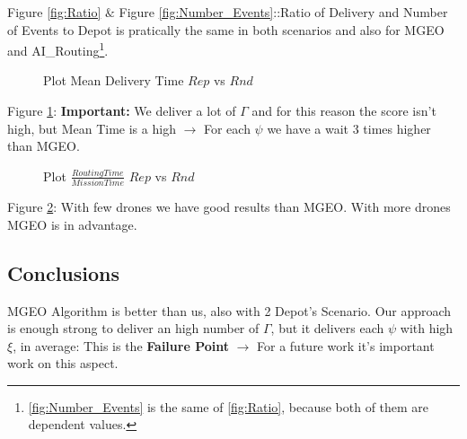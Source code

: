 \documentclass[12pt]{article}
\begin{document}
Figure \ref{fig:Ratio} $\&$ Figure \ref{fig:Number_Events}::Ratio of Delivery and Number of Events to Depot is pratically the same in both scenarios and also for MGEO and AI\_Routing\footnote{\ref{fig:Number_Events} is the same of \ref{fig:Ratio}, because both of them are dependent values.}.


\begin{figure}[H]
    
    \qquad
    
    \caption{Plot Mean Delivery Time $Rep$ vs $Rnd$}
    
    \label{fig:Mean_Delivery}%
\end{figure}

Figure \ref{fig:Mean_Delivery}: \textbf{Important:} We deliver a lot of $\Gamma$ and for this reason the score isn't high, but Mean Time is a high $\rightarrow$ For each $\psi$ we have a wait 3 times higher than MGEO.

\begin{figure}[H]
    
    \qquad
    
    \caption{Plot $\frac{Routing Time}{Mission Time}$ $Rep$ vs $Rnd$}
    
    \label{fig:Final}%
\end{figure}

Figure \ref{fig:Final}: With few drones we have good results than MGEO. With more drones MGEO is in advantage.




\subsection{Conclusions}

MGEO Algorithm is better than us, also with 2 Depot's Scenario. Our approach is enough strong to deliver an high number of $\Gamma$, but it delivers each $\psi$ with high $\xi$, in average: This is the \textbf{Failure Point} $\rightarrow$ For a future work it's important work on this aspect.
\end{document}
